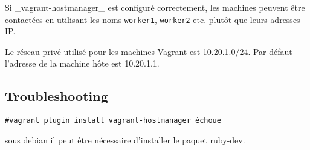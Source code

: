 \documentclass[a4paper,oneside,11pt]{article}
\begin{document}
Si \_vagrant-hostmanager\_ est configuré correctement, les machines peuvent être contactées en utilisant les noms \verb!worker1!, \verb!worker2! etc. plutôt que leurs adresses IP.

Le réseau privé utilisé pour les machines Vagrant est 10.20.1.0/24. Par défaut l'adresse de la machine hôte est 10.20.1.1.

\subsection{Troubleshooting}

\verb!#vagrant plugin install vagrant-hostmanager échoue!

sous debian il peut être nécessaire d'installer le paquet ruby-dev.
\end{document}

